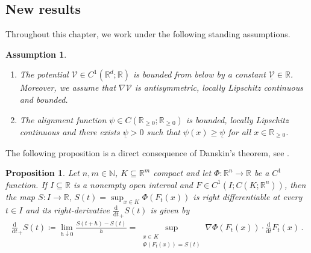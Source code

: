 \documentclass[11pt]{article}
\newtheorem{proposition}[theorem]{Proposition}
\newtheorem{assumption}[theorem]{Assumption}
\newcommand{\R}[0]{\mathbb R}
\newcommand{\N}[0]{\mathbb N}
\newcommand{\dx}[1]{\frac{\mathrm{d}}{\mathrm{d}#1}}
\begin{document}
\begin{bibunit}[unsrtnat]
\section{New results}\label{sec:newresults}
Throughout this chapter, we work under the following standing assumptions.
\begin{assumption}\label{ass:asymptotics} %
   \begin{enumerate}
       \item The potential $\mathcal{V} \in C^1(\R^d ; \R)$ is bounded from below by a constant $\underline{\mathcal{V}} \in \R$. Moreover, we assume that $\nabla \mathcal{V}$ is antisymmetric, locally Lipschitz continuous and bounded.
       \item The alignment function $\psi \in C(\R_{\geq 0};\R_{\geq 0})$ is bounded, locally Lipschitz continuous and there exists $\underline{\psi} > 0$ such that $\psi(x) \geq \underline{\psi}$ for all $x \in \R_{\geq 0}$.
   \end{enumerate}
\end{assumption}
The following proposition is a direct consequence of Danskin's theorem, see \cite[Theorem 1]{Danskin}.
\begin{proposition}\label{prop:Danskin}
    Let $n , m \in \N$, $K \subseteq \R^m $ compact and let $\varPhi \colon \R^n\to \R$ be a $C^{1}$ function. If $I \subseteq \R$ is a nonempty open interval and $F \in C^{1}(I; C(K; \R^n) )$, then the map $S \colon I \to \R, \, S(t) = \sup_{x \in K} \varPhi(F_t(x))$ is right differentiable at every $t \in I$ and its right-derivative $\dx{t}_+ S(t)$ is given by 
    \begin{align*}
        \dx{t}_+ S(t) \coloneq \lim\limits_{h \downarrow 0} \frac{S(t + h) - S(t)}{h} =  \sup\limits_{\substack{x \in K \\ \varPhi(F_t(x)) = S(t) }} \nabla \varPhi(F_t(x)) \cdot \dx{t} F_t(x) \, . 
    \end{align*}
\end{proposition}


\end{bibunit}
\end{document}

